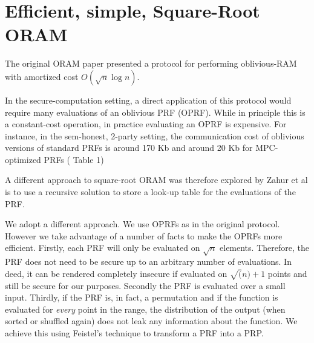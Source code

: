 \section{Efficient, simple, Square-Root ORAM}

The original ORAM paper \cite{ostrovsky1997private} presented a protocol for performing
oblivious-RAM with amortized cost $O(\sqrt{n} \log{n})$.

In the secure-computation setting, a direct application of this
protocol would require many evaluations of an oblivious PRF (OPRF).
While in principle this is a constant-cost operation, in practice evaluating an OPRF is expensive. For instance, in the sem-honest, 2-party setting, the communication cost of oblivious versions of standard PRFs is around 170 Kb and around 20 Kb for MPC-optimized PRFs (\cite{hemenway2019private} Table 1) %

A different approach to square-root ORAM was therefore explored by Zahur et al is to use a recursive solution to store a look-up table for the evaluations of the PRF.

We adopt a different approach. We use OPRFs as in the original protocol.
However we take advantage of a number of facts to make the OPRFs more efficient.
Firstly, each PRF will only be evaluated on $\sqrt{n}$ elements.
Therefore, the PRF does not need to be secure up to an arbitrary number of 
evaluations. In deed, it can be rendered completely insecure if evaluated
on $\sqrt(n) + 1$ points and still be secure for our purposes.
Secondly the PRF is evaluated over a small input.
Thirdly, if the PRF is, in fact, a permutation and 
if the function is evaluated for \emph{every} point in the range,
the distribution of the output (when sorted or shuffled again)
does not leak any information about the function.
We achieve this using Feistel's technique to transform a PRF into a PRP.

